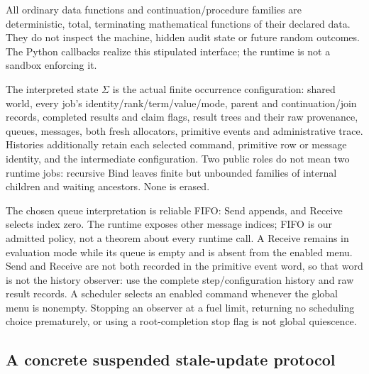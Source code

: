 \documentclass[11pt]{article}
\begin{document}
All ordinary data functions and continuation/procedure families are deterministic, total, terminating mathematical functions of their declared data. They do not inspect the machine, hidden audit state or future random outcomes. The Python callbacks realize this stipulated interface; the runtime is not a sandbox enforcing it.

The interpreted state $\Sigma$ is the actual finite occurrence configuration: shared world, every job's identity/rank/term/value/mode, parent and continuation/join records, completed results and claim flags, result trees and their raw provenance, queues, messages, both fresh allocators, primitive events and administrative trace. Histories additionally retain each selected command, primitive row or message identity, and the intermediate configuration. Two public roles do not mean two runtime jobs: recursive Bind leaves finite but unbounded families of internal children and waiting ancestors. None is erased.

The chosen queue interpretation is reliable FIFO: Send appends, and Receive selects index zero. The runtime exposes other message indices; FIFO is our admitted policy, not a theorem about every runtime call. A Receive remains in evaluation mode while its queue is empty and is absent from the enabled menu. Send and Receive are not both recorded in the primitive event word, so that word is not the history observer: use the complete step/configuration history and raw result records. A scheduler selects an enabled command whenever the global menu is nonempty. Stopping an observer at a fuel limit, returning no scheduling choice prematurely, or using a root-completion stop flag is not global quiescence.

\subsection{A concrete suspended stale-update protocol}
\end{document}
